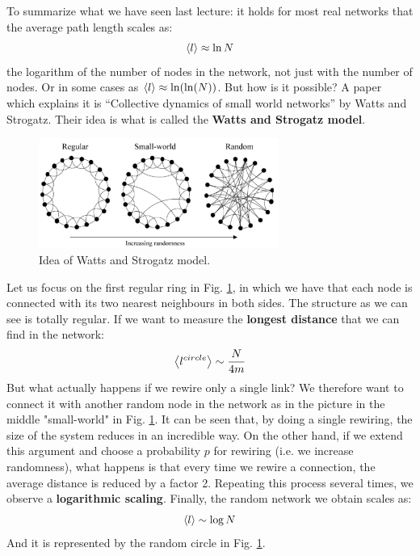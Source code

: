 \documentclass[../main/main.tex]{subfiles}
\begin{document}

To summarize what we have seen last lecture: it holds for most real networks that the average path length scales as:
\begin{equation*}
  \expval{l} \approx \ln{N}
\end{equation*}
the logarithm of the number of nodes in the network, not just with the number of nodes. Or in some cases as \( \expval{l} \approx \ln(\ln(N))  \).
But how is it possible? A paper which explains it is “Collective dynamics of small world networks” by Watts and Strogatz. Their idea is what is called the \textbf{Watts and Strogatz model}.

\begin{figure}[h!]
\centering
\includegraphics[width=0.7\textwidth]{../lessons/image/06/1.png}
\caption{\label{fig:06_1} Idea of Watts and Strogatz model.}
\end{figure}


Let us focus on the first regular ring in Fig. \ref{fig:06_1}, in which we have that each node is connected with its two nearest neighbours in both sides. The structure as we can see is totally regular. If we want to measure the \textbf{longest distance} that we can find in the network:
\begin{equation*}
  \expval{l^{circle}} \sim \frac{N}{4 m}
\end{equation*}
But what actually happens if we rewire only a single link? We therefore want to connect it with another random node in the network as in the picture in the middle "small-world" in Fig. \ref{fig:06_1}. It can be seen that, by doing a single rewiring, the size of the system reduces in an incredible way. On the other hand, if we extend this argument and choose a probability $p$ for rewiring (i.e. we increase randomness), what happens is that every time we rewire a connection, the average distance is reduced by a factor 2. Repeating this process several times, we observe a \textbf{logarithmic scaling}. Finally, the random network we obtain scales as:
\begin{equation*}
  \expval{l} \sim \log{N}
\end{equation*}
And it is represented by the random circle in Fig. \ref{fig:06_1}.
\end{document}
